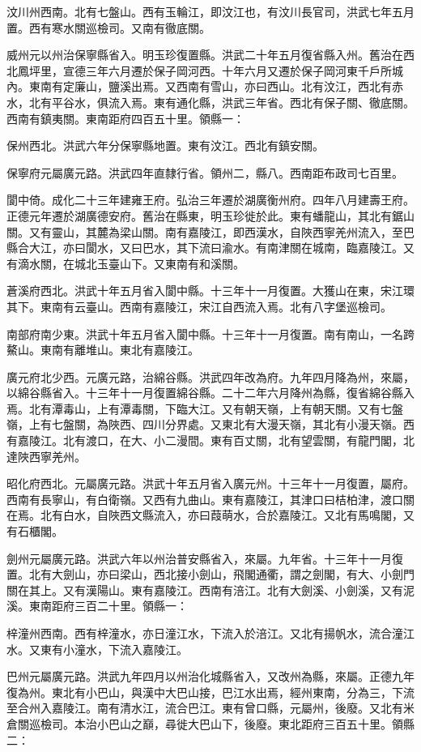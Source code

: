 汶川州西南。北有七盤山。西有玉輪江，即汶江也，有汶川長官司，洪武七年五月置。西有寒水關巡檢司。又南有徹底關。

威州元以州治保寧縣省入。明玉珍復置縣。洪武二十年五月復省縣入州。舊治在西北鳳坪里，宣德三年六月遷於保子岡河西。十年六月又遷於保子岡河東千戶所城內。東南有定廉山，鹽溪出焉。又西南有雪山，亦曰西山。北有汶江，西北有赤水，北有平谷水，俱流入焉。東有通化縣，洪武三年省。西北有保子關、徹底關。西南有鎮夷關。東南距府四百五十里。領縣一：

保州西北。洪武六年分保寧縣地置。東有汶江。西北有鎮安關。

保寧府元屬廣元路。洪武四年直隸行省。領州二，縣八。西南距布政司七百里。

閬中倚。成化二十三年建雍王府。弘治三年遷於湖廣衡州府。四年八月建壽王府。正德元年遷於湖廣德安府。舊治在縣東，明玉珍徙於此。東有蟠龍山，其北有鋸山關。又有靈山，其麓為梁山關。南有嘉陵江，即西漢水，自陜西寧羌州流入，至巴縣合大江，亦曰閬水，又曰巴水，其下流曰渝水。有南津關在城南，臨嘉陵江。又有滴水關，在城北玉臺山下。又東南有和溪關。

蒼溪府西北。洪武十年五月省入閬中縣。十三年十一月復置。大獲山在東，宋江環其下。東南有云臺山。西南有嘉陵江，宋江自西流入焉。北有八字堡巡檢司。

南部府南少東。洪武十年五月省入閬中縣。十三年十一月復置。南有南山，一名跨鰲山。東南有離堆山。東北有嘉陵江。

廣元府北少西。元廣元路，治綿谷縣。洪武四年改為府。九年四月降為州，來屬，以綿谷縣省入。十三年十一月復置綿谷縣。二十二年六月降州為縣，復省綿谷縣入焉。北有潭毒山，上有潭毒關，下臨大江。又有朝天嶺，上有朝天關。又有七盤嶺，上有七盤關，為陜西、四川分界處。又東北有大漫天嶺，其北有小漫天嶺。西有嘉陵江。北有渡口，在大、小二漫間。東有百丈關，北有望雲關，有龍門閣，北達陜西寧羌州。

昭化府西北。元屬廣元路。洪武十年五月省入廣元州。十三年十一月復置，屬府。西南有長寧山，有白衛嶺。又西有九曲山。東有嘉陵江，其津口曰桔柏津，渡口關在焉。北有白水，自陜西文縣流入，亦曰葭萌水，合於嘉陵江。又北有馬鳴閣，又有石櫃閣。

劍州元屬廣元路。洪武六年以州治普安縣省入，來屬。九年省。十三年十一月復置。北有大劍山，亦曰梁山，西北接小劍山，飛閣通衢，謂之劍閣，有大、小劍門關在其上。又有漢陽山。東有嘉陵江。西南有涪江。北有大劍溪、小劍溪，又有泥溪。東南距府三百二十里。領縣一：

梓潼州西南。西有梓潼水，亦日潼江水，下流入於涪江。又北有揚帆水，流合潼江水。又東有小潼水，下流入嘉陵江。

巴州元屬廣元路。洪武九年四月以州治化城縣省入，又改州為縣，來屬。正德九年復為州。東北有小巴山，與漢中大巴山接，巴江水出焉，經州東南，分為三，下流至合州入嘉陵江。南有清水江，流合巴江。東有曾口縣，元屬州，後廢。又北有米倉關巡檢司。本治小巴山之巔，尋徙大巴山下，後廢。東北距府三百五十里。領縣二：

